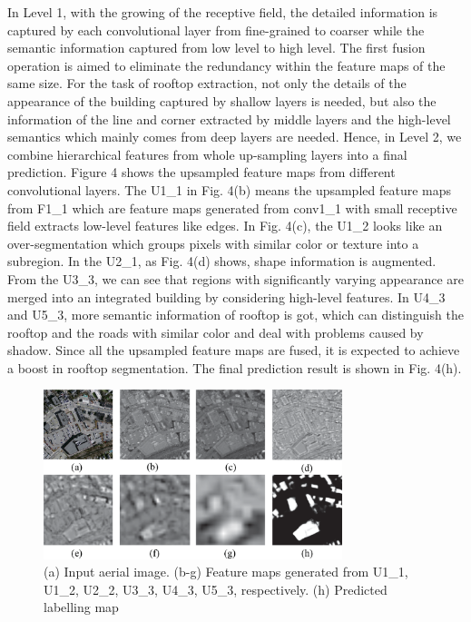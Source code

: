 \setlength{\parindent}{2ex}In Level 1, with the growing of the receptive field, the detailed information is captured by each convolutional layer from fine-grained to coarser while the semantic information captured from low level to high level. The first fusion operation is aimed to eliminate the redundancy within the feature maps of the same size. For the task of rooftop extraction, not only the details of the appearance of the building captured by shallow layers is needed, but also the information of the line and corner extracted by middle layers and the high-level semantics which mainly comes from deep layers are needed. Hence, in Level 2, we combine hierarchical features from whole up-sampling layers into a final prediction. Figure 4 shows the upsampled feature maps from different convolutional layers. The U1\_1 in Fig. 4(b) means the upsampled feature maps from F1\_1 which are feature maps generated from conv1\_1 with small receptive field extracts low-level features like edges. In Fig. 4(c), the U1\_2 looks like an over-segmentation which groups pixels with similar color or texture into a subregion. In the U2\_1, as Fig. 4(d) shows, shape information is augmented. From the U3\_3, we can see that regions with significantly varying appearance are merged into an integrated building by considering high-level features. In U4\_3 and U5\_3, more semantic information of rooftop is got, which can distinguish the rooftop and the roads with similar color and deal with problems caused by shadow. Since all the upsampled feature maps are fused, it is expected to achieve a boost in rooftop segmentation. The final prediction result is shown in Fig. 4(h).
\begin{figure}
\centering
\includegraphics[width=8.7cm]{Figures/feature_maps.eps}
\caption{(a) Input aerial image. (b-g) Feature maps generated from U1\_1, U1\_2, U2\_2, U3\_3, U4\_3, U5\_3, respectively. (h) Predicted labelling map}
\label{4}
\end{figure}
